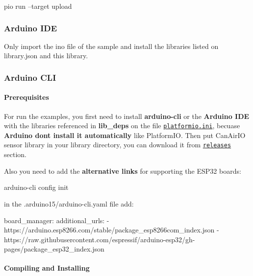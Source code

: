 \begin{DoxyCode}
pio run --target upload
\end{DoxyCode}


\subsubsection*{Arduino I\+DE}

Only import the {\ttfamily ino} file of the sample and install the libraries listed on {\ttfamily library.\+json} and this library.

\subsubsection*{Arduino C\+LI}

\paragraph*{Prerequisites}

For run the examples, you first need to install {\bfseries arduino-\/cli} or the {\bfseries Arduino I\+DE} with the libraries referenced in {\bfseries lib\+\_\+deps} on the file \href{https://github.com/kike-canaries/canairio_sensorlib/blob/fix_ondataready_cb/platformio.ini}{\tt platformio.\+ini}, becuase {\bfseries Arduino don\textquotesingle{}t install it automatically} like Platform\+IO. Then put Can\+Air\+IO sensor library in your library directory, you can download it from \href{https://github.com/kike-canaries/canairio_sensorlib/releases}{\tt releases} section.

Also you need to add the {\bfseries alternative links} for supporting the E\+S\+P32 boards\+:


\begin{DoxyCode}
arduino-cli config init
\end{DoxyCode}


in the {\ttfamily .arduino15/arduino-\/cli.\+yaml} file add\+:


\begin{DoxyCode}
board\_manager:
  additional\_urls:
    - https://arduino.esp8266.com/stable/package\_esp8266com\_index.json
    - https://raw.githubusercontent.com/espressif/arduino-esp32/gh-pages/package\_esp32\_index.json
\end{DoxyCode}


\paragraph*{Compiling and Installing}

